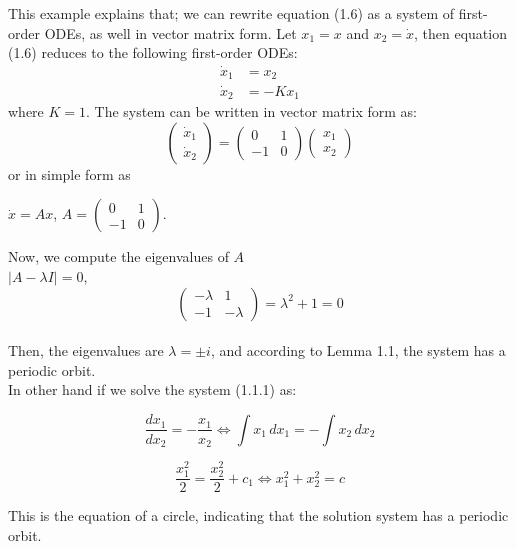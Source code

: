 \documentclass[17pt]{extarticle}
\begin{document}
\newpage 
This example explains that; we can rewrite equation (1.6) as a system of first-order ODEs, as well in vector matrix form. Let $x_1 = x$ and $x_2 = \dot{x}$, then equation (1.6) reduces to the following first-order ODEs:
\begin{align}
    \dot{x}_1 &= x_2 \\
    \dot{x}_2 &= -Kx_1
\end{align}
where $K = 1$. The system can be written in vector matrix form as:
\[
\begin{pmatrix}
    \dot{x}_1 \\
    \dot{x}_2
\end{pmatrix}
= 
\begin{pmatrix}
    0 & 1 \\
    -1 & 0
\end{pmatrix}
\begin{pmatrix}
    x_1 \\
    x_2
\end{pmatrix}
\]
or in simple form as \\

\begin{center}
$\dot{x} = Ax$, $A = \begin{pmatrix}0 & 1\\ -1 & 0\end{pmatrix}$. 
\end{center}
Now, we compute the eigenvalues of $A$ \\
$|A - \lambda I| = 0$,
\[

\begin{pmatrix}
    -\lambda & 1 \\
    -1 & -\lambda
\end{pmatrix} = \lambda^2 +1 = 0
\]
\\ 
Then, the eigenvalues are $\lambda = \pm i$, and according to Lemma 1.1, the system has a periodic orbit. \\
In other hand if we solve the system (1.1.1) as:

\newpage 






\[
\frac{dx_1}{dx_2} = -\frac{x_1}{x_2} \iff \int x_1 \, dx_1 = - \int x_2 \, dx_2 
\]

\[
\frac{x_1^2}{2} = \frac{x_2^2}{2} + c_1 \iff x_1^2 + x_2^2 = c
\]

This is the equation of a circle, indicating that the solution system has a periodic orbit.
\end{document}
